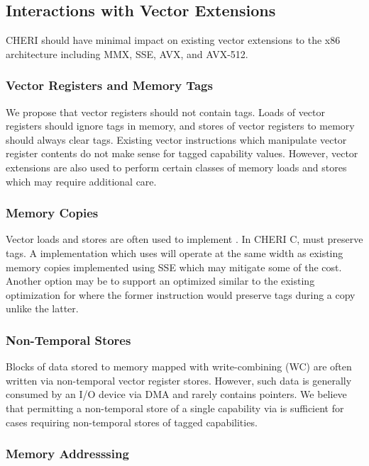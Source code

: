 \subsection{Interactions with Vector Extensions}

CHERI should have minimal impact on existing vector extensions to the
x86 architecture including MMX, SSE, AVX, and AVX-512.

\subsubsection{Vector Registers and Memory Tags}

We propose that vector registers should not contain tags.  Loads of
vector registers should ignore tags in memory, and stores of vector
registers to memory should always clear tags.  Existing vector
instructions which manipulate vector register contents do not make
sense for tagged capability values.  However, vector extensions are
also used to perform certain classes of memory loads and stores which
may require additional care.

\subsubsection{Memory Copies}

Vector loads and stores are often used to implement .
In CHERI C,  must preserve tags.  A 
implementation which uses  will operate at the same
width as existing memory copies implemented using SSE which may
mitigate some of the cost.  Another option may be to support an
optimized  similar to the existing optimization
for  where the former instruction would preserve
tags during a copy unlike the latter.

\subsubsection{Non-Temporal Stores}

Blocks of data stored to memory mapped with write-combining (WC) are
often written via non-temporal vector register stores.  However, such
data is generally consumed by an I/O device via DMA and rarely
contains pointers.  We believe that permitting a non-temporal store of
a single capability via  is sufficient for cases
requiring non-temporal stores of tagged capabilities.

\subsubsection{Memory Addresssing}

